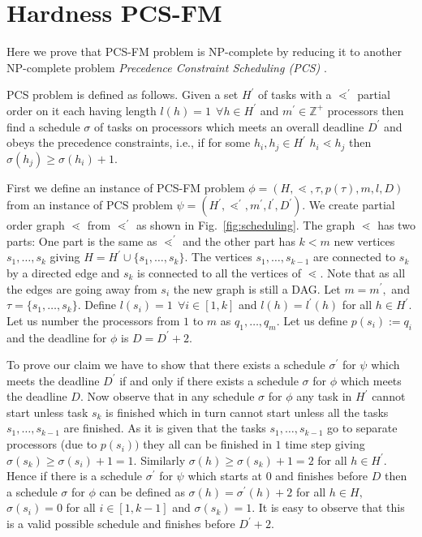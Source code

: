 \documentclass[journal]{IEEEtran}
\begin{document}




\appendices

\section{Hardness PCS-FM}
\label{sec:PCS-FM}

Here we prove that PCS-FM problem is NP-complete by reducing it to
another NP-complete problem \textit{Precedence Constraint Scheduling
  (PCS)} \cite{Garey79}.

PCS problem is defined as follows. Given a set $H^{\prime}$ of tasks
with a $\lessdot^{\prime}$ partial order on it each having length
$l(h) =1\ \ \forall h \in H^{\prime}$ and $m^{\prime} \in \mathbb{Z}^{+}$
processors then find a schedule $\sigma$ of tasks on processors which
meets an overall deadline $D^{\prime}$ and obeys the precedence
constraints, i.e., if for some $h_i,h_j \in H^{\prime}$ $h_i \lessdot
h_j$ then $\sigma(h_j) \geq \sigma(h_i) + 1.$

First we define an instance of PCS-FM problem $\phi =
(H,\lessdot,\tau,p(\tau),m,l,D)$ from an instance of PCS problem $\psi
= (H^{\prime},\lessdot^{\prime},m^{\prime},l^{\prime},D^{\prime}).$ We
create partial order graph $\lessdot$ from $\lessdot^{\prime}$ as
shown in Fig.~\ref{fig:scheduling}. The graph $\lessdot$ has two
parts: One part is the same as $\lessdot^{\prime}$ and the other part
has $k < m$ new vertices $s_1,\ldots,s_k$ giving $H = H^{\prime} \cup
\{s_1,\ldots,s_k\}.$ The vertices $s_1,\ldots,s_{k-1}$ are connected
to $s_k$ by a directed edge and $s_k$ is connected to all the vertices
of $\lessdot.$ Note that as all the edges are going away from $s_i$
the new graph is still a DAG. Let $m= m^{\prime},$ and $\tau =
\{s_1,\ldots,s_k\}.$ Define $l(s_i) = 1 \ \ \forall i \in [1,k]$ and
$l(h) = l^{\prime}(h)$ for all $h \in H^{\prime}.$ Let us number the
processors from $1$ to $m$ as $q_1, \ldots,q_m.$ Let us define $p(s_i)
:= q_i$ and the deadline for $\phi$ is $D = D^{\prime} + 2.$

To prove our claim we have to show that there exists a schedule
$\sigma^{\prime}$ for $\psi$ which meets the deadline $D^{\prime}$ if
and only if there exists a schedule $\sigma$ for $\phi$ which meets
the deadline $D.$ Now observe that in any schedule $\sigma$ for $\phi$
any task in $H^{\prime}$ cannot start unless task $s_k$ is finished
which in turn cannot start unless all the tasks $s_1,\ldots,s_{k-1}$
are finished. As it is given that the tasks $s_1,\ldots,s_{k-1}$ go to
separate processors (due to $p(s_i))$ they all can be finished in $1$
time step giving $\sigma(s_k) \geq \sigma(s_i)+1 = 1.$ Similarly
$\sigma(h) \geq \sigma(s_k) +1 = 2$ for all $h \in H^{\prime}.$ Hence
if there is a schedule $\sigma^{\prime}$ for $\psi$ which starts at
$0$ and finishes before $D$ then a schedule $\sigma$ for $\phi$ can be
defined as $\sigma(h) = \sigma^{\prime}(h) +2$ for all $h \in H,$
$\sigma(s_i) = 0$ for all $i \in [1,k-1]$ and $\sigma(s_k) = 1.$ It is
easy to observe that this is a valid possible schedule and finishes
before $D^{\prime}+2.$
\end{document}
